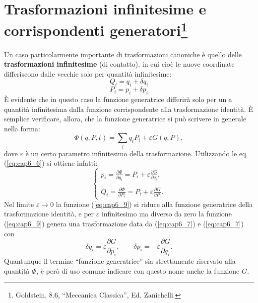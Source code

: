 \section[Trasformazioni infinitesime e corrispondenti generatori]{Trasformazioni infinitesime e corrispondenti generatori\footnote{Goldstein, 8.6,  ``Meccanica Classica'', Ed. Zanichelli.}}
Un caso particolarmente importante di trasformazioni canoniche è quello delle \textbf{trasformazioni infinitesime} (di contatto), in cui cioè le nuove coordinate differiscono dalle vecchie solo per quantità infinitesime:
\begin{equation}
Q_i = q_i + \delta q _i \label{eq:cap6_7}
\end{equation}
\begin{equation}
P_i = p_i + \delta p _i \label{eq:cap6_8} 
\end{equation}
È evidente che in questo caso la funzione generatrice differirà solo per un a quantità infinitesima dalla funzione corrispondente alla trasformazione identità. È semplice verificare, allora, che la funzione generatrice si può scrivere in generale nella forma:
\begin{equation}
\Phi(q, P, t) = \sum _i q_iP_i +\varepsilon G(q, P) ,
\label{eq:cap6_9}
\end{equation}
dove $\varepsilon $ è un certo parametro infinitesimo della trasformazione. Utilizzando le eq. (\ref{eq:cap6_6}) si ottiene infatti:
\begin{equation}
\begin{cases}
\displaystyle{p_i= \frac{\partial \Phi}{\partial q_i} = P_i + \varepsilon \frac{\partial G}{\partial q_i }, }\\
\\
\displaystyle{Q_i= \frac{\partial \Phi}{\partial P_i} = P_i + \varepsilon \frac{\partial G}{\partial P_i }.}
\end{cases}
\end{equation}
Nel limite $\varepsilon \rightarrow 0$ la funzione (\ref{eq:cap6_9}) si riduce alla funzione generatrice della trasformazione identità, e per $\varepsilon$ infinitesimo ma diverso da zero la funzione (\ref{eq:cap6_9}) genera una trasformazione data da (\ref{eq:cap6_7}) e (\ref{eq:cap6_7}) con
\begin{equation}
\delta q_i = \varepsilon \frac{\partial G}{\partial p_i },\qquad \delta p _i = -\varepsilon \frac{\partial G}{\partial q_i } .
\label{eq:cap6_11}
\end{equation}
Quantunque il termine  ``funzione generatrice''  sia strettamente riservato alla quantità $\Phi$, è però di uso comune indicare con questo nome anche la funzione $G$.\\

